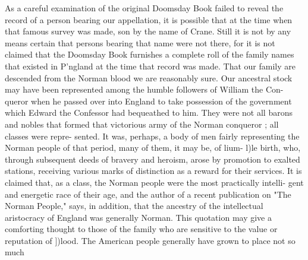 \documentclass{book}
\begin{document}
As a careful examination of the original Doomsday Book failed 
to reveal the record of a person bearing our appellation, it is 
possible that at the time when that famous survey was made, 
son by the name of Crane. Still it is not by any means certain 
that persons bearing that name were not there, for it is not 
claimed that the Doomsday Book furnishes a complete roll of the 
family names that existed in P'ngland at the time that record was 
made. That our family are descended from the Norman blood 
we are reasonably sure. Our ancestral stock may have been 
represented among the humble followers of William the Con- 
queror when he passed over into England to take possession of 
the government which Edward the Confessor had bequeathed to 
him. They were not all barons and nobles that formed that 
victorious army of the Norman conqueror ; all classes were repre- 
sented. It was, perhaps, a body of men fairly representing the 
Norman people of that period, many of them, it may be, of lium- 
l)le birth, who, through subsequent deeds of bravery and heroism, 
arose by promotion to exalted stations, receiving various marks 
of distinction as a reward for their services. It is claimed that, 
as a class, the Norman people were the most practically intelli- 
gent and energetic race of their age, and the author of a recent 
publication on "The Norman People," says, in addition, that the 
ancestry of the intellectual aristocracy of England was generally 
Norman. This quotation may give a comforting thought to those 
of the family who are sensitive to the value or reputation of ])lood. 
The American people generally have grown to place not so much 
\end{document}
